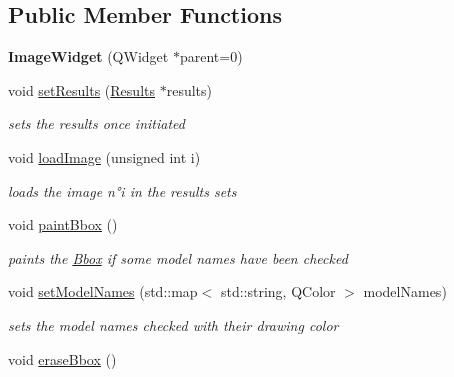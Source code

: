 \subsection*{Public Member Functions}
\begin{DoxyCompactItemize}
\item 
{\bfseries Image\+Widget} (Q\+Widget $\ast$parent=0)\hypertarget{class_image_widget_a29f5483569b0ac4abd6b25bb640f9250}{}\label{class_image_widget_a29f5483569b0ac4abd6b25bb640f9250}

\item 
void \hyperlink{class_image_widget_a0e3dfd9d7747707f659310b175629e5e}{set\+Results} (\hyperlink{class_results}{Results} $\ast$results)
\begin{DoxyCompactList}\small\item\em sets the results once initiated \end{DoxyCompactList}\item 
void \hyperlink{class_image_widget_ac41822f2c322b22eb62ac553011b0423}{load\+Image} (unsigned int i)
\begin{DoxyCompactList}\small\item\em loads the image n°i in the results sets \end{DoxyCompactList}\item 
void \hyperlink{class_image_widget_a10cd7197e52740e168ef5261aa16ca7a}{paint\+Bbox} ()\hypertarget{class_image_widget_a10cd7197e52740e168ef5261aa16ca7a}{}\label{class_image_widget_a10cd7197e52740e168ef5261aa16ca7a}

\begin{DoxyCompactList}\small\item\em paints the \hyperlink{class_bbox}{Bbox} if some model names have been checked \end{DoxyCompactList}\item 
void \hyperlink{class_image_widget_a774f0d94f4cd8a0ed0d7c8a30b20da56}{set\+Model\+Names} (std\+::map$<$ std\+::string, Q\+Color $>$ model\+Names)
\begin{DoxyCompactList}\small\item\em sets the model names checked with their drawing color \end{DoxyCompactList}\item 
void \hyperlink{class_image_widget_ae572ff8733d9ece83441a37e1b7a91ae}{erase\+Bbox} ()\hypertarget{class_image_widget_ae572ff8733d9ece83441a37e1b7a91ae}{}\label{class_image_widget_ae572ff8733d9ece83441a37e1b7a91ae}


\end{DoxyCompactItemize}
